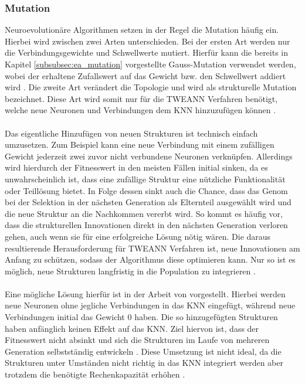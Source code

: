 \subsubsection{Mutation}
Neuroevolutionäre Algorithmen setzen in der Regel die Mutation häufig ein. Hierbei wird zwischen zwei Arten unterschieden. Bei der ersten Art werden nur die Verbindungsgewichte und Schwellwerte mutiert. Hierfür kann die bereits in Kapitel \ref{subsubsec:ea_mutation} vorgestellte Gauss-Mutation verwendet werden, wobei der erhaltene Zufallswert auf das Gewicht bzw. den Schwellwert addiert wird \cite{mcintyre_neatpython}. Die zweite Art verändert die Topologie und wird als strukturelle Mutation bezeichnet. Diese Art wird somit nur für die \ac{TWEANN} Verfahren benötigt, welche neue Neuronen und Verbindungen dem \ac{KNN} hinzuzufügen können \cite{stanley2002evolving}.
\\\\
Das eigentliche Hinzufügen von neuen Strukturen ist technisch einfach umzusetzen. Zum Beispiel kann eine neue Verbindung mit einem zufälligen Gewicht jederzeit zwei zuvor nicht verbundene Neuronen verknüpfen. Allerdings wird hierdurch der Fitnesswert in den meisten Fällen initial sinken, da es unwahrscheinlich ist, dass eine zufällige Struktur eine nützliche Funktionalität oder Teillösung bietet. In Folge dessen sinkt auch die Chance, dass das Genom bei der Selektion in der nächsten Generation als Elternteil ausgewählt wird und die neue Struktur an die Nachkommen vererbt wird. So kommt es häufig vor, dass die strukturellen Innovationen direkt in den nächsten Generation verloren gehen, auch wenn sie für eine erfolgreiche Lösung nötig wären. Die daraus resultierende Herausforderung für \ac{TWEANN} Verfahren ist, neue Innovationen am Anfang zu schützen, sodass der Algorithmus diese optimieren kann. Nur so ist es möglich, neue Strukturen langfristig in die Population zu integrieren \cite{stanley2002evolving}.
\\\\
Eine mögliche Lösung hierfür ist in der Arbeit von \citeauthor{angeline1994gnarl} vorgestellt. Hierbei werden neue Neuronen ohne jegliche Verbindungen in das \ac{KNN} eingefügt, während neue Verbindungen initial das Gewicht $0$ haben. Die so hinzugefügten Strukturen haben anfänglich keinen Effekt auf das \ac{KNN}. Ziel hiervon ist, dass der Fitnesswert nicht absinkt und sich die Strukturen im Laufe von mehreren Generation selbstständig entwickeln \cite{angeline1994gnarl}. Diese Umsetzung ist nicht ideal, da die Strukturen unter Umständen nicht richtig in das \ac{KNN} integriert werden aber trotzdem die benötigte Rechenkapazität erhöhen \cite{stanley2002evolving}.
